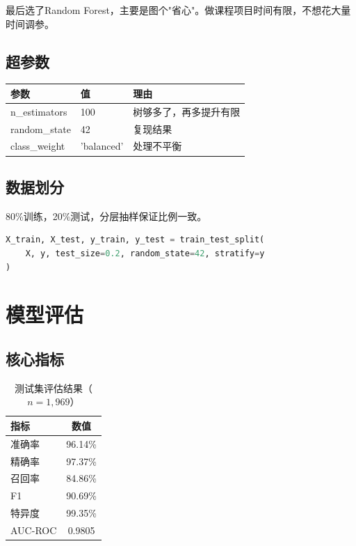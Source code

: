 \documentclass[12pt,a4paper]{article}
\begin{document}
最后选了Random Forest，主要是图个"省心"。做课程项目时间有限，不想花大量时间调参。

\subsection{超参数}

\begin{table}[H]
\centering
\begin{tabular}{@{}lll@{}}
\toprule
\textbf{参数} & \textbf{值} & \textbf{理由} \\
\midrule
n\_estimators & 100 & 树够多了，再多提升有限 \\
random\_state & 42 & 复现结果 \\
class\_weight & 'balanced' & 处理不平衡 \\
\bottomrule
\end{tabular}
\end{table}

\subsection{数据划分}

80\%训练，20\%测试，分层抽样保证比例一致。

\begin{lstlisting}[language=Python]
X_train, X_test, y_train, y_test = train_test_split(
    X, y, test_size=0.2, random_state=42, stratify=y
)
\end{lstlisting}

\section{模型评估}

\subsection{核心指标}

\begin{table}[H]
\centering
\caption{测试集评估结果（$n=1{,}969$）}
\begin{tabular}{@{}lc@{}}
\toprule
\textbf{指标} & \textbf{数值} \\
\midrule
准确率 & 96.14\% \\
精确率 & 97.37\% \\
召回率 & 84.86\% \\
F1 & 90.69\% \\
特异度 & 99.35\% \\
AUC-ROC & 0.9805 \\
\bottomrule
\end{tabular}
\end{table}
\end{document}
